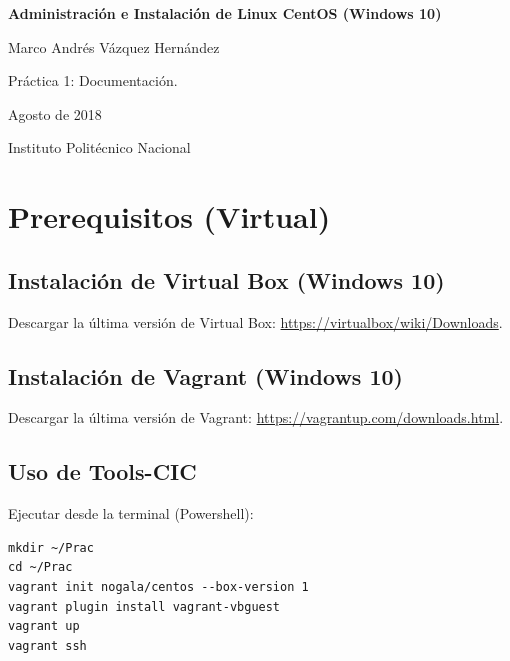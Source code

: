 \documentclass[]{article}
\title{}
\author{}
\date{}
\begin{document}
\begin{centering}

\vspace*{5 cm}

\Huge

{\bf Administración e Instalación de Linux CentOS (Windows 10)}

\vspace{3 cm}

\Large
Marco Andrés Vázquez Hernández

\vspace{1 cm}
\normalsize
Práctica 1: Documentación. 

Agosto de 2018

\normalsize
Instituto Politécnico Nacional


\end{centering}

\newpage

\section{Prerequisitos (Virtual)}\label{prerequisitos-virtual}

\subsection{Instalación de Virtual Box (Windows
10)}\label{instalacion-de-virtual-box-windows-10}

Descargar la última versión de Virtual Box:
\url{https://virtualbox/wiki/Downloads}.

\subsection{Instalación de Vagrant (Windows
10)}\label{instalacion-de-vagrant-windows-10}

Descargar la última versión de Vagrant:
\url{https://vagrantup.com/downloads.html}.

\subsection{Uso de Tools-CIC}\label{uso-de-tools-cic}

Ejecutar desde la terminal (Powershell):

\begin{verbatim}
mkdir ~/Prac
cd ~/Prac
vagrant init nogala/centos --box-version 1
vagrant plugin install vagrant-vbguest
vagrant up
vagrant ssh
\end{verbatim}
\end{document}
